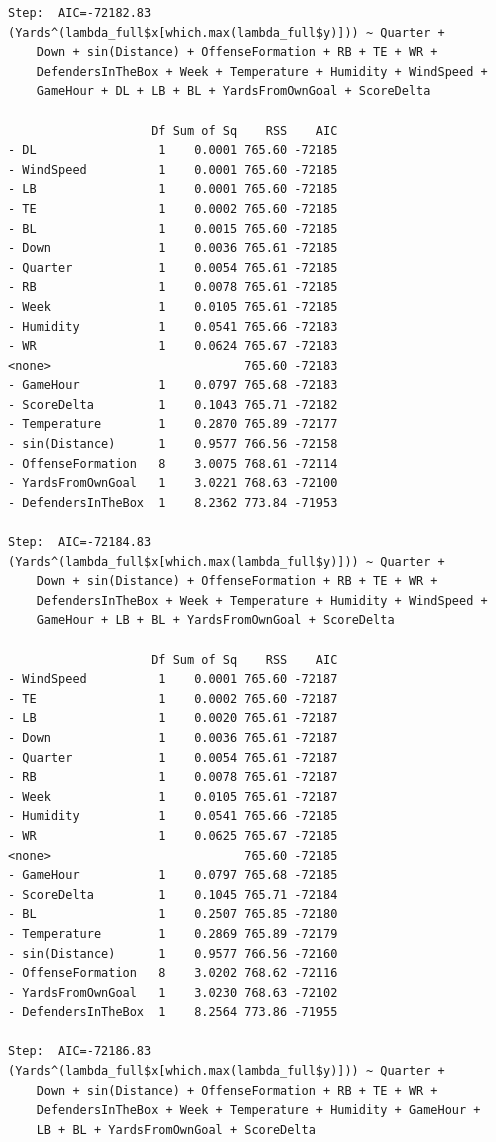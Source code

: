 \documentclass[
  super,
  preprint,
  3p]{elsarticle}
\begin{document}
\begin{verbatim}
Step:  AIC=-72182.83
(Yards^(lambda_full$x[which.max(lambda_full$y)])) ~ Quarter + 
    Down + sin(Distance) + OffenseFormation + RB + TE + WR + 
    DefendersInTheBox + Week + Temperature + Humidity + WindSpeed + 
    GameHour + DL + LB + BL + YardsFromOwnGoal + ScoreDelta

                    Df Sum of Sq    RSS    AIC
- DL                 1    0.0001 765.60 -72185
- WindSpeed          1    0.0001 765.60 -72185
- LB                 1    0.0001 765.60 -72185
- TE                 1    0.0002 765.60 -72185
- BL                 1    0.0015 765.60 -72185
- Down               1    0.0036 765.61 -72185
- Quarter            1    0.0054 765.61 -72185
- RB                 1    0.0078 765.61 -72185
- Week               1    0.0105 765.61 -72185
- Humidity           1    0.0541 765.66 -72183
- WR                 1    0.0624 765.67 -72183
<none>                           765.60 -72183
- GameHour           1    0.0797 765.68 -72183
- ScoreDelta         1    0.1043 765.71 -72182
- Temperature        1    0.2870 765.89 -72177
- sin(Distance)      1    0.9577 766.56 -72158
- OffenseFormation   8    3.0075 768.61 -72114
- YardsFromOwnGoal   1    3.0221 768.63 -72100
- DefendersInTheBox  1    8.2362 773.84 -71953

Step:  AIC=-72184.83
(Yards^(lambda_full$x[which.max(lambda_full$y)])) ~ Quarter + 
    Down + sin(Distance) + OffenseFormation + RB + TE + WR + 
    DefendersInTheBox + Week + Temperature + Humidity + WindSpeed + 
    GameHour + LB + BL + YardsFromOwnGoal + ScoreDelta

                    Df Sum of Sq    RSS    AIC
- WindSpeed          1    0.0001 765.60 -72187
- TE                 1    0.0002 765.60 -72187
- LB                 1    0.0020 765.61 -72187
- Down               1    0.0036 765.61 -72187
- Quarter            1    0.0054 765.61 -72187
- RB                 1    0.0078 765.61 -72187
- Week               1    0.0105 765.61 -72187
- Humidity           1    0.0541 765.66 -72185
- WR                 1    0.0625 765.67 -72185
<none>                           765.60 -72185
- GameHour           1    0.0797 765.68 -72185
- ScoreDelta         1    0.1045 765.71 -72184
- BL                 1    0.2507 765.85 -72180
- Temperature        1    0.2869 765.89 -72179
- sin(Distance)      1    0.9577 766.56 -72160
- OffenseFormation   8    3.0202 768.62 -72116
- YardsFromOwnGoal   1    3.0230 768.63 -72102
- DefendersInTheBox  1    8.2564 773.86 -71955

Step:  AIC=-72186.83
(Yards^(lambda_full$x[which.max(lambda_full$y)])) ~ Quarter + 
    Down + sin(Distance) + OffenseFormation + RB + TE + WR + 
    DefendersInTheBox + Week + Temperature + Humidity + GameHour + 
    LB + BL + YardsFromOwnGoal + ScoreDelta


\end{verbatim}
\end{document}
